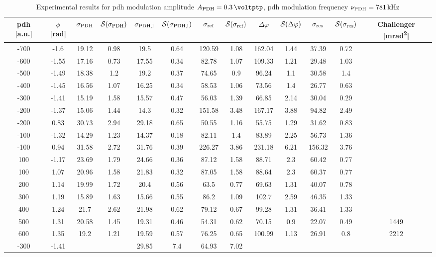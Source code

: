 \begin{landscape}
	\begin{table}
	\centering
	\begin{tabular}{|c|c|c|c|c|c|c|c|c|c|c|c|c|}
		\hline
		\gls{pdh} [a.u.] & $\phi$ [\si{\radian}] & $\sigma_{\text{PDH}}$ & $\mathcal{S}(\sigma_{\text{PDH}})$ & $\sigma_{\text{PDH,l}}$ & $\mathcal{S}(\sigma_{\text{PDH,l}})$  & $\sigma_{\text{ref}}$ & $\mathcal{S}(\sigma_{\text{ref}})$ & $\Delta \varphi$ & $\mathcal{S}(\Delta \varphi)$ & $\sigma_{\text{res}}$  & $\mathcal{S}(\sigma_{\text{res}})$ & Challenger [\si{\milli\radian\squared}] \\
		\hline
		\hline
		-700 & -1.6 & 19.12 & 0.98 & 19.5 & 0.64 & 120.59 & 1.08 & 162.04 & 1.44 & 37.39 & 0.72 & \\
		-600 & -1.55 & 17.16 & 0.73 & 17.55 & 0.34 & 82.78 & 1.07 & 109.33 & 1.21 & 29.48 & 1.03 & \\
		-500 & -1.49 & 18.38 & 1.2 & 19.2 & 0.37 & 74.65 & 0.9 & 96.24 & 1.1 & 30.58 & 1.4 & \\
		-400 & -1.45 & 16.56 & 1.07 & 16.25 & 0.34 & 58.53 & 1.06 & 73.56 & 1.4 & 26.77 & 0.63 & \\
		-300 & -1.41 & 15.19 & 1.58 & 15.57 & 0.47 & 56.03 & 1.39 & 66.85 & 2.14 & 30.04 & 0.29 & \\
		-200 & -1.37 & 15.06 & 1.44 & 14.3 & 0.32 & 151.58 & 3.48 & 167.17 & 3.88 & 94.82 & 2.49 & \\
		-200 & 0.83 & 30.73 & 2.94 & 29.18 & 0.65 & 50.55 & 1.16 & 55.75 & 1.29 & 31.62 & 0.83 & \\
		-100 & -1.32 & 14.29 & 1.23 & 14.37 & 0.18 & 82.11 & 1.4 & 83.89 & 2.25 & 56.73 & 1.36 & \\
		-100 & 0.94 & 31.58 & 2.72 & 31.76 & 0.39 & 226.27 & 3.86 & 231.18 & 6.21 & 156.32 & 3.76 & \\
		100 & -1.17 & 23.69 & 1.79 & 24.66 & 0.36 & 87.12 & 1.58 & 88.71 & 2.3 & 60.42 & 0.77 & \\
		100 & 1.07 & 20.96 & 1.58 & 21.83 & 0.32 & 87.05 & 1.58 & 88.64 & 2.3 & 60.37 & 0.77 & \\
		200 & 1.14 & 19.99 & 1.72 & 20.4 & 0.56 & 63.5 & 0.77 & 69.63 & 1.31 & 40.07 & 0.78 & \\
		300 & 1.19 & 15.89 & 1.63 & 15.66 & 0.55 & 86.2 & 1.09 & 102.7 & 2.59 & 46.35 & 1.33 & \\
		400 & 1.24 & 21.7 & 2.62 & 21.98 & 0.62 & 79.12 & 0.67 & 99.28 & 1.31 & 36.41 & 1.33 & \\
		500 & 1.31 & 20.58 & 1.45 & 19.31 & 0.46 & 54.31 & 0.62 & 70.15 & 0.9 & 22.07 & 0.49 & 1449\\
		600 & 1.35 & 19.2 & 1.21 & 19.59 & 0.57 & 76.25 & 0.65 & 100.99 & 1.13 & 26.91 & 0.8 & 2212\\
		\hline
		\hline
		-300 & -1.41 & & & 29.85 & 7.4 & 64.93 & 7.02 & & & & &\\
		\hline 
	\end{tabular}
	\caption{Experimental results for \gls{pdh} modulation amplitude $\tind{A}{PDH} = \SI{0.3}{\voltptp}$, \gls{pdh} modulation frequency $\nu_{\text{PDH}} = \SI{781}{\kilo\hertz}$}
	\end{table}
	

\end{landscape}

